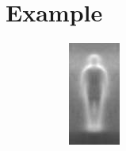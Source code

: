 \documentclass[thesis.tex]{subfiles}
\begin{document}
\section{Example}
\begin{figure}
	\centering
	\begin{subfigure}[t]{0.135\textwidth}
		\includegraphics[width=\textwidth]{img/hogExample1.jpg}

\end{subfigure}
\end{figure}
\end{document}

